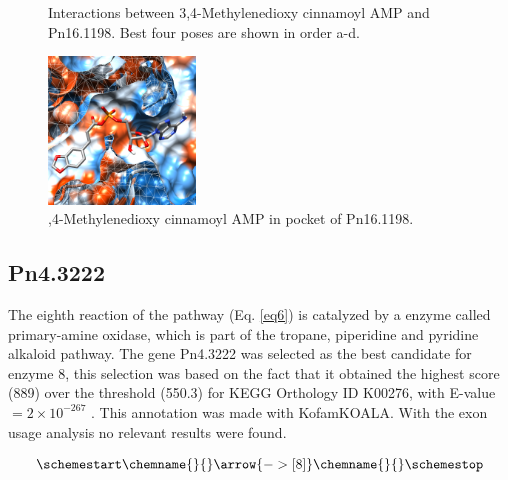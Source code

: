 \documentclass[12pt]{article}
\begin{document}
\begin{figure}[h]
\begin{subfigure}[h!]{0.35\textwidth}
			\caption{}
		\end{subfigure}
		\hfill
		\caption[\centering Interactions between 3,4-Methylenedioxy cinnamoyl AMP and Pn16.1198]{Interactions between 3,4-Methylenedioxy cinnamoyl AMP and Pn16.1198. Best four poses are shown in order a-d.}
		\label{fig6p_3}
	\end{figure}
	\FloatBarrier
	
	
	\FloatBarrier
	\begin{figure}[h!]
		\centering
		\includegraphics[width=0.35\textwidth]{../6/propose/Dock/chimera.png}
		\caption{,4-Methylenedioxy cinnamoyl AMP in pocket of Pn16.1198.}
		\label{fig6p_4}
	\end{figure}
	\FloatBarrier

	\newpage
	
	\subsection{Pn4.3222}
	
	The eighth reaction of the pathway (Eq. \ref{eq6}) is catalyzed by a enzyme called primary-amine oxidase, which is part of the tropane, piperidine and pyridine alkaloid pathway. The gene Pn4.3222 was selected as the best candidate for enzyme 8, this selection was based on the fact that it obtained the highest score (889) over the threshold (550.3) for KEGG Orthology ID K00276, with E-value $= 2\times 10^{-267}$ . This annotation was made with KofamKOALA. \cite{kofamkoala} With the exon usage analysis no relevant results were found.
	
	\begin{equation}
	\schemestart
	\chemname{\footnotesize}{\vspace{-50pt}}\arrow{->[ 8]}\chemname{\footnotesize}{\vspace{-50pt}}
	\label{eq6}
	\schemestop
	\end{equation}\\
	
\end{document}

